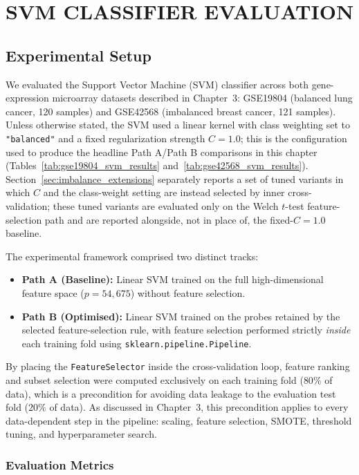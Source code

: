 \chapter{SVM CLASSIFIER EVALUATION}

\section{Experimental Setup}

We evaluated the Support Vector Machine (SVM) classifier across both gene-expression microarray datasets described in Chapter~3: GSE19804 (balanced lung cancer, 120 samples) and GSE42568 (imbalanced breast cancer, 121 samples). Unless otherwise stated, the SVM used a linear kernel with class weighting set to \texttt{"balanced"} and a fixed regularization strength $C = 1.0$; this is the configuration used to produce the headline Path A/Path B comparisons in this chapter (Tables~\ref{tab:gse19804_svm_results} and~\ref{tab:gse42568_svm_results}). Section~\ref{sec:imbalance_extensions} separately reports a set of tuned variants in which $C$ and the class-weight setting are instead selected by inner cross-validation; these tuned variants are evaluated only on the Welch $t$-test feature-selection path and are reported alongside, not in place of, the fixed-$C=1.0$ baseline.

The experimental framework comprised two distinct tracks:
\begin{itemize}
    \item \textbf{Path A (Baseline):} Linear SVM trained on the full high-dimensional feature space ($p = 54,675$) without feature selection.
    \item \textbf{Path B (Optimised):} Linear SVM trained on the probes retained by the selected feature-selection rule, with feature selection performed strictly \textit{inside} each training fold using \texttt{sklearn.pipeline.Pipeline}.
\end{itemize}

By placing the \texttt{FeatureSelector} inside the cross-validation loop, feature ranking and subset selection were computed exclusively on each training fold ($80\%$ of data), which is a precondition for avoiding data leakage to the evaluation test fold ($20\%$ of data). As discussed in Chapter~3, this precondition applies to every data-dependent step in the pipeline: scaling, feature selection, SMOTE, threshold tuning, and hyperparameter search.

\subsection{Evaluation Metrics}

